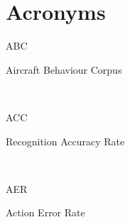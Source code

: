 \chapter*{Acronyms}

\newcommand{\acr}[2]{\parbox[t]{3cm}{#1\dotfill}\parbox[t]{11.5cm}{#2} \vspace{0.2cm} \\}

\acr{ABC}{Aircraft Behaviour Corpus}
\acr{ACC}{Recognition Accuracy Rate}
\acr{AER}{Action Error Rate}

